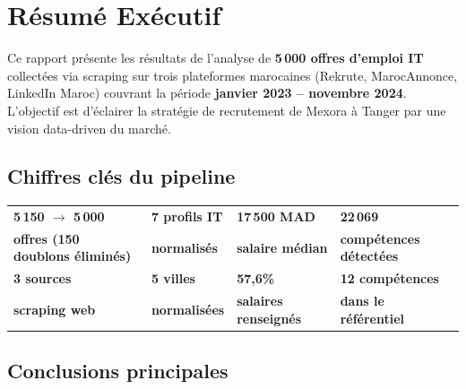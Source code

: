 \documentclass[12pt,a4paper]{article}
\begin{document}
\tableofcontents
\newpage

\section{Résumé Exécutif}

\begin{keybox}
Ce rapport présente les résultats de l'analyse de \textbf{5\,000 offres d'emploi IT} collectées via scraping sur trois plateformes marocaines (Rekrute, MarocAnnonce, LinkedIn Maroc) couvrant la période \textbf{janvier 2023 -- novembre 2024}. L'objectif est d'éclairer la stratégie de recrutement de Mexora à Tanger par une vision data-driven du marché.
\end{keybox}

\subsection{Chiffres clés du pipeline}

\begin{center}
\renewcommand{\arraystretch}{1.4}
\begin{tabularx}{\textwidth}{>{\centering\bfseries}X >{\centering\bfseries}X >{\centering\bfseries}X >{\centering\arraybackslash\bfseries}X}
\toprule
\color{mexblue}5\,150 $\rightarrow$ 5\,000 & \color{mexcyan}7 profils IT & \color{mexorange}17\,500 MAD & \color{mexgreen}22\,069 \\
offres (150 doublons éliminés) & normalisés & salaire médian & compétences détectées \\
\midrule
\color{mexblue}3 sources & \color{mexcyan}5 villes & \color{mexorange}57,6\% & \color{mexgreen}12 compétences \\
scraping web & normalisées & salaires renseignés & dans le référentiel \\
\bottomrule
\end{tabularx}
\end{center}

\subsection{Conclusions principales}
\end{document}
